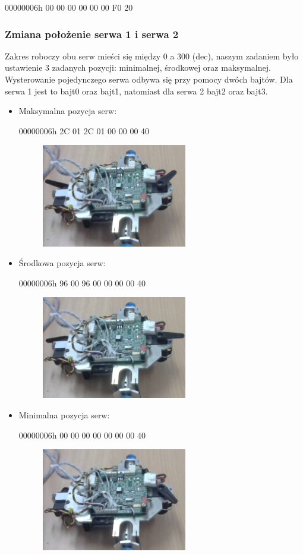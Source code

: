 \documentclass[margin = 2cm]{article}
\begin{document}
	00000006h	00 00 00 00 00 00 F0 20
	\subsubsection{Zmiana położenie serwa 1 i serwa 2}
	Zakres roboczy obu serw mieści się między 0 a 300 (dec), naszym zadaniem było ustawienie 3 zadanych pozycji: minimalnej, środkowej oraz maksymalnej. Wysterowanie pojedynczego serwa odbywa się przy pomocy dwóch bajtów. Dla serwa 1 jest to bajt0 oraz bajt1, natomiast dla    serwa 2  bajt2 oraz bajt3.
	

	\begin{itemize}
	\item Maksymalna pozycja serw:
	
	00000006h	2C 01 2C 01 00 00 00 40
	\begin{figure}[H]
		\centering
		\includegraphics[width=0.6\textwidth]{max}
	\end{figure}
	 \item Środkowa pozycja serw:
	
	00000006h	96 00 96 00 00 00 00 40
	\begin{figure}[H]
		\centering
		\includegraphics[width=0.6\textwidth]{middle}
	\end{figure}
	\item Minimalna pozycja serw:
	
	00000006h	00 00 00 00 00 00 00 40
	\begin{figure}[H]
		\centering
		\includegraphics[width=0.6\textwidth]{min}
	\end{figure}

	\end{itemize}
\end{document}
